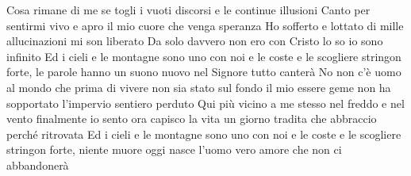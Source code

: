 \beginverse
Cosa rimane di me se togli i vuoti discorsi e le continue illusioni
Canto per sentirmi vivo e apro il mio cuore che venga speranza
Ho sofferto e lottato di mille allucinazioni mi son liberato
Da solo davvero non ero con Cristo lo so io sono infinito
\endverse
\beginchorus
Ed i cieli e le montagne sono uno con noi
e le coste e le scogliere stringon forte,
le parole hanno un suono nuovo
nel Signore tutto canterà
\endchorus
\beginverse
No non c'è uomo al mondo che prima di vivere
non sia stato sul fondo
il mio essere geme non ha sopportato
l'impervio sentiero perduto
Qui più vicino a me stesso nel freddo e nel vento
finalmente io sento
ora capisco la vita un giorno tradita
che abbraccio perché ritrovata
\endverse
\beginchorus
Ed i cieli e le montagne sono uno con noi
e le coste e le scogliere stringon forte,
niente muore oggi nasce l'uomo
vero amore che non ci abbandonerà
\endchorus
\endsong

